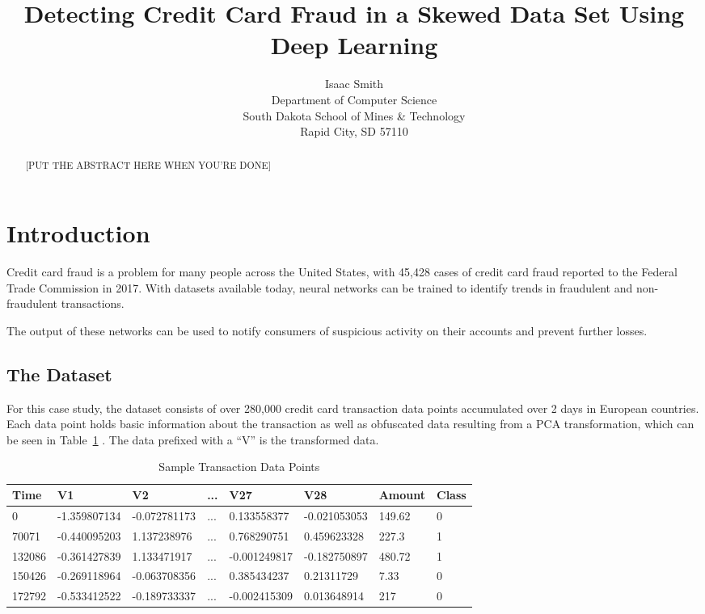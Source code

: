 \documentclass{article}
\title{Detecting Credit Card Fraud in a Skewed Data Set Using Deep Learning}
\author{
  Isaac Smith \\
  Department of Computer Science\\
  South Dakota School of Mines & Technology\\
  Rapid City, SD 57110 \\
}
\begin{document}

\maketitle

\begin{abstract}
 [PUT THE ABSTRACT HERE WHEN YOU'RE DONE]
\end{abstract}

\section{Introduction}

 Credit card fraud is a problem for many people across the United States,
 with 45,428 cases of credit card fraud reported to the Federal Trade Commission in 2017.
 With datasets available today, neural networks can be trained to identify trends
 in fraudulent and non-fraudulent transactions.

 The output of these networks can be used to notify consumers of
 suspicious activity on their accounts and prevent further losses.


\subsection{The Dataset}

For this case study, the dataset consists of over 280,000 credit card transaction 
data points accumulated over 2 days in European countries. Each data point 
holds basic information about the transaction as well as obfuscated data resulting 
from a PCA transformation, which can be seen in Table~\ref{sample-points} . The data 
prefixed with a “V” is the transformed data.

\begin{table}[htb]
  \caption{Sample Transaction Data Points}
  \label{sample-points}
  \centering
  \begin{tabular}{llllllll}	
    \toprule
    Time & V1 & V2  & ... & V27 & V28 & Amount & Class \\
    \midrule
    0 & -1.359807134  & -0.072781173 &    ...    & 0.133558377 & -0.021053053 & 149.62 & 0    \\
    70071 & -0.440095203  & 1.137238976 &    ...    & 0.768290751 & 0.459623328 & 227.3 & 1    \\
    132086 & -0.361427839 & 1.133471917 &    ...    & -0.001249817 & -0.182750897 & 480.72 & 1 \\
    150426 & -0.269118964  & -0.063708356 &    ...    & 0.385434237 & 0.21311729 & 7.33 & 0    \\
    172792 & -0.533412522  & -0.189733337 &    ...    & -0.002415309 & 0.013648914 & 217 & 0    \\
    \bottomrule
  \end{tabular}
\end{table}
\end{document}
